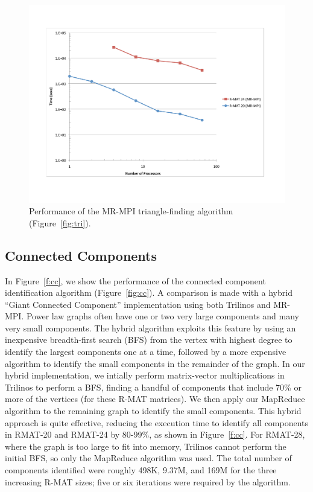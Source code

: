 
\begin{figure}[htb]
\includegraphics[width=\textwidth]{fig_tri.pdf}
\caption{Performance of the MR-MPI triangle-finding algorithm
(Figure~\ref{fig:tri}).}
\label{f:tri}
\end{figure}

\subsection{Connected Components}

In Figure~\ref{f:cc}, we show the performance of the connected
component identification algorithm (Figure~\ref{fig:cc}).  A
comparison is made with a hybrid ``Giant Connected Component''
implementation using both Trilinos and MR-MPI.  Power law graphs often
have one or two very large components and many very small components.
The hybrid algorithm exploits this feature by using an inexpensive
breadth-first search (BFS) from the vertex with highest degree to
identify the largest components one at a time, followed by a more
expensive algorithm to identify the small components in the remainder
of the graph.  In our hybrid implementation, we intially perform
matrix-vector multiplications in Trilinos to perform a BFS, finding a
handful of components that include 70\% or more of the vertices (for
these R-MAT matrices).  We then apply our MapReduce algorithm to the
remaining graph to identify the small components.  This hybrid
approach is quite effective, reducing the execution time to identify
all components in RMAT-20 and RMAT-24 by 80-99\%, as shown in
Figure~\ref{f:cc}.  For RMAT-28, where the graph is too large to fit
into memory, Trilinos cannot perform the initial BFS, so only the
MapReduce algorithm was used.  The total number of components
identified were roughly 498K, 9.37M, and 169M for the three increasing 
R-MAT sizes; five or six iterations were 
required by the algorithm.

